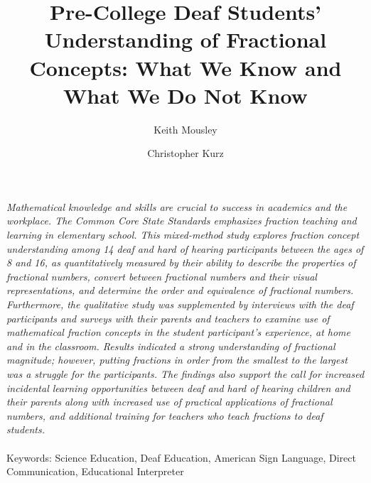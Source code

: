 \documentclass[11.5pt]{sig-alternate} %
\makeatletter
\let\oldabstract\abstract
\let\oldendabstract\endabstract
\renewenvironment{abstract} %
{\renewenvironment{quotation}%
               {\list{}{\addtolength{\leftmargin}{1em} %
                        \listparindent 1.5em%
                        \itemindent    \listparindent%
                        \rightmargin   \leftmargin%
                        \parsep        \z@ \@plus\p@}%
                \item\relax}%
               {\endlist}%
\oldabstract}
{\oldendabstract}
\makeatother
\begin{document}
\title{Pre-College Deaf Students’ Understanding of Fractional Concepts: What We Know and What We Do Not Know}

\author[1]{\large \color{blue}Keith Mousley}
\author[1]{\large \color{blue}Christopher Kurz}


\toappear{}
\maketitle
\begin{@twocolumnfalse} 
\begin{abstract}
\item 
\textit{Mathematical knowledge and skills are crucial to success in academics and the workplace. The Common Core State Standards emphasizes fraction teaching and learning in elementary school. This mixed-method study explores fraction concept understanding among 14 deaf and hard of hearing participants between the ages of 8 and 16, as quantitatively measured by their ability to describe the properties of fractional numbers, convert between fractional numbers and their visual representations, and determine the order and equivalence of fractional numbers. Furthermore, the qualitative study was supplemented by interviews with the deaf participants and surveys with their parents and teachers to examine use of mathematical fraction concepts in the student participant's experience, at home and in the classroom. Results indicated a strong understanding of fractional magnitude; however, putting fractions in order from the smallest to the largest was a struggle for the participants. The findings also support the call for increased incidental learning opportunities between deaf and hard of hearing children and their parents along with increased use of practical applications of fractional numbers, and additional training for teachers who teach fractions to deaf students.}
\\ \\
Keywords: Science Education, Deaf Education, American Sign Language, Direct Communication, Educational Interpreter
\end{abstract}
\end{@twocolumnfalse}

\end{document}
